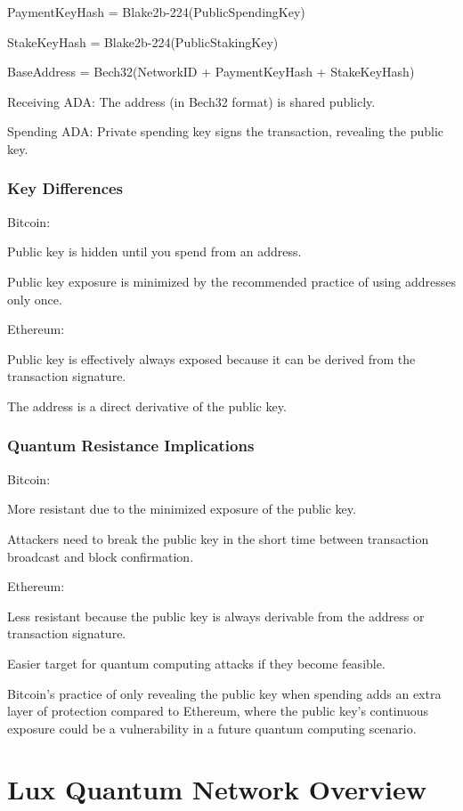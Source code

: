 \documentclass[11pt]{article}
\begin{document}
PaymentKeyHash = Blake2b-224(PublicSpendingKey)


StakeKeyHash = Blake2b-224(PublicStakingKey)


BaseAddress = Bech32(NetworkID + PaymentKeyHash + StakeKeyHash)


Receiving ADA: The address (in Bech32 format) is shared publicly.


Spending ADA: Private spending key signs the transaction, revealing the public key.


\subsubsection{Key Differences}

Bitcoin:


Public key is hidden until you spend from an address.


Public key exposure is minimized by the recommended practice of using addresses only once.


Ethereum:


Public key is effectively always exposed because it can be derived from the transaction signature.


The address is a direct derivative of the public key.


\subsubsection{Quantum Resistance Implications}

Bitcoin:


More resistant due to the minimized exposure of the public key.


Attackers need to break the public key in the short time between transaction broadcast and block confirmation.


Ethereum:


Less resistant because the public key is always derivable from the address or transaction signature.


Easier target for quantum computing attacks if they become feasible.


Bitcoin's practice of only revealing the public key when spending adds an extra layer of protection compared to Ethereum, where the public key's continuous exposure could be a vulnerability in a future quantum computing scenario.


\section{Lux Quantum Network Overview}
\end{document}
